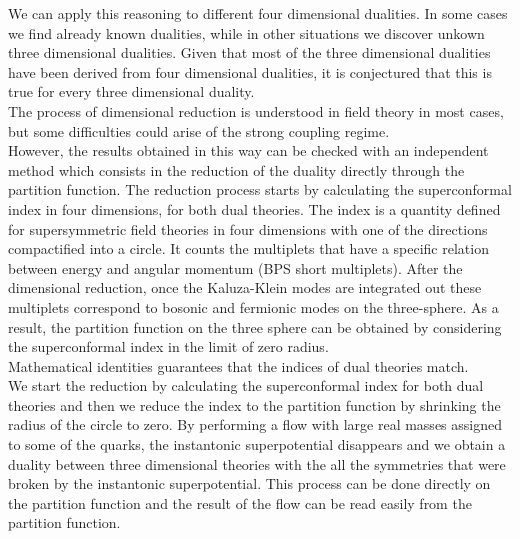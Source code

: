 We can apply this reasoning to different four dimensional dualities. 
In some cases we find already known dualities, while in other situations we discover unkown three dimensional dualities. 
Given that most of the three dimensional dualities have been derived from four dimensional dualities, it is conjectured that this is true for every three dimensional duality.\\

The process of dimensional reduction is understood in field theory in most cases, but some difficulties could arise of the strong coupling regime.\\
However, the results obtained in this way can be checked with an independent method which consists in the reduction of the duality directly through the partition function.
The reduction process starts by calculating the superconformal index in four dimensions, for both dual theories. 
The index is a quantity defined for supersymmetric field theories in four dimensions with one of the directions compactified into a circle.
It counts the multiplets that have a specific relation between energy and angular momentum (BPS short multiplets). 
After the dimensional reduction, once the Kaluza-Klein modes are integrated out these multiplets correspond to bosonic and fermionic modes on the three-sphere.  
As a result, the partition function on the three sphere can be obtained by considering the superconformal index in the limit of zero radius.\\
Mathematical identities guarantees that the indices of dual theories match.\\

We start the reduction by calculating the superconformal index for both dual theories and then we reduce the index to the partition function by shrinking the radius of the circle to zero.
By performing a flow with large real masses assigned to some of the quarks, the instantonic superpotential disappears and we obtain a duality between three dimensional theories with the all the symmetries that were broken by the instantonic superpotential.
This process can be done directly on the partition function and the result of the flow can be read easily from the partition function.\\

